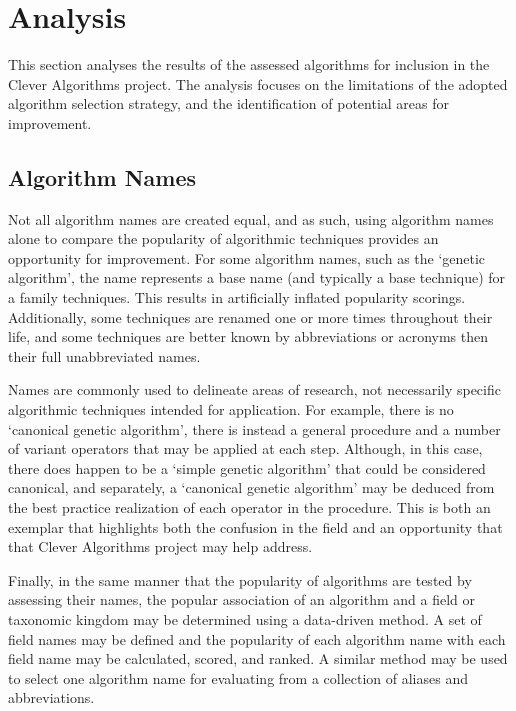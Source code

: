 \documentclass[a4paper, 11pt]{article}
\begin{document}
% 
% 
\section{Analysis}
\label{sec:analysis}
This section analyses the results of the assessed algorithms for inclusion in the Clever Algorithms project. The analysis focuses on the limitations of the adopted algorithm selection strategy, and the identification of potential areas for improvement.

\subsection{Algorithm Names}
Not all algorithm names are created equal, and as such, using algorithm names alone to compare the popularity of algorithmic techniques provides an opportunity for improvement. For some algorithm names, such as the `genetic algorithm', the name represents a base name (and typically a base technique) for a family techniques. This results in artificially inflated popularity scorings. Additionally, some techniques are renamed one or more times throughout their life, and some techniques are better known by abbreviations or acronyms then their full unabbreviated names.

Names are commonly used to delineate areas of research, not necessarily specific algorithmic techniques intended for application. For example, there is no `canonical genetic algorithm', there is instead a general procedure and a number of variant operators that may be applied at each step. Although, in this case, there does happen to be a `simple genetic algorithm' that could be considered canonical, and separately, a `canonical genetic algorithm' may be deduced from the best practice realization of each operator in the procedure. This is both an exemplar that highlights both the confusion in the field and an opportunity that that Clever Algorithms project may help address.

Finally, in the same manner that the popularity of algorithms are tested by assessing their names, the popular association of an algorithm and a field or taxonomic kingdom may be determined using a data-driven method. A set of field names may be defined and the popularity of each algorithm name with each field name may be calculated, scored, and ranked. A similar method may be used to select one algorithm name for evaluating from a collection of aliases and abbreviations.

\end{document}
